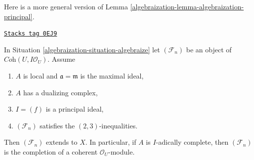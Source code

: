 Here is a more general version of Lemma \ref{algebraization-lemma-algebraization-principal}.

\begin{lemma}
\label{algebraization-lemma-algebraization-principal-bis}
\href{https://stacks.math.columbia.edu/tag/0EJ9}{\texttt{Stacks tag 0EJ9}}

In Situation \ref{algebraization-situation-algebraize} let $(\mathcal{F}_n)$ be an object
of $\textit{Coh}(U, I\mathcal{O}_U)$. Assume
\begin{enumerate}
\item $A$ is local and $\mathfrak a = \mathfrak m$ is the maximal ideal,
\item $A$ has a dualizing complex,
\item $I = (f)$ is a principal ideal,
\item $(\mathcal{F}_n)$ satisfies the $(2, 3)$-inequalities.
\end{enumerate}
Then $(\mathcal{F}_n)$ extends to $X$. In particular, if $A$ is
$I$-adically complete, then $(\mathcal{F}_n)$ is the completion
of a coherent $\mathcal{O}_U$-module.
\end{lemma}

